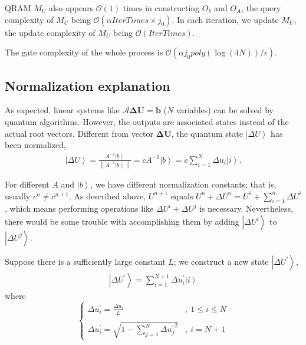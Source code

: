 \documentclass[%
 reprint,
 amsmath,amssymb,
pra,
]{revtex4-1}
\begin{document}
QRAM $M_U$ also appears $\mathcal{O}(1)$ times in constructing $O_b$ and $O_A$, the query complexity of $M_U$ being $\mathcal{O}(\alpha IterTimes\times j_0)$. In each iteration, we update $M_U$, the update complexity of $M_U$ being $\mathcal{O}(IterTimes)$.

The gate complexity of the whole process is $\mathcal{O}(\alpha j_0poly(\log(4N))/\epsilon)$.


\subsection{Normalization explanation}
As expected, linear systems like $\mathcal{A} \bm{\Delta U} = \bm{b}$ ($N$ variables) can be solved by quantum algorithms. However, the outputs are associated states instead of the actual root vectors. Different from vector $\bm{\Delta U}$, the quantum state $\left| \Delta U\right\rangle$ has been normalized,
\begin{align}
\left|\Delta U\right\rangle=\frac{A^{-1}\left|b\right\rangle}{\left\|A^{-1}\left|b\right\rangle\right\|}
= c A^{-1} \left|b\right\rangle = c \sum_{i=1}^{N} \Delta u_i\left|i\right\rangle.
\end{align}

For different $A$ and $\left|b\right\rangle$, we have different normalization constants; that is, usually $c^{n} \neq c^{n+1}$. As described above, $U^{n+1}$ equals $U^{n} + \Delta U^{n} = U^{1} + \sum_{i=1}^{n} \Delta U^{i}$, which means performing operations like $\Delta U^{i} + \Delta U^{j}$ is necessary. Nevertheless, there would be some trouble with accomplishing them by adding $\left|\Delta U^{i}\right\rangle$ to $\left|\Delta U^{j}\right\rangle$.

Suppose there is a sufficiently large constant $L$; we construct a new state $\left|\Delta U^{\prime}\right\rangle$,
\begin{align}
\left|\Delta U^{\prime}\right\rangle = \sum_{i=1}^{N+1}\Delta u_i^{\prime}\left|i\right\rangle
\end{align}
where
\begin{equation}
\left\{
\begin{array}{ll}
  \Delta u_i^{\prime} = \frac{\Delta u_i}{L}&,\ 1\leq i \leq N\\
  &\\
  \Delta u_i^{\prime} = \sqrt{1 - \sum_{j=1}^{N}{\Delta u_j^{\prime}}^2}&,\ i=N+1
\end{array}
\right.
\end{equation}
\end{document}
